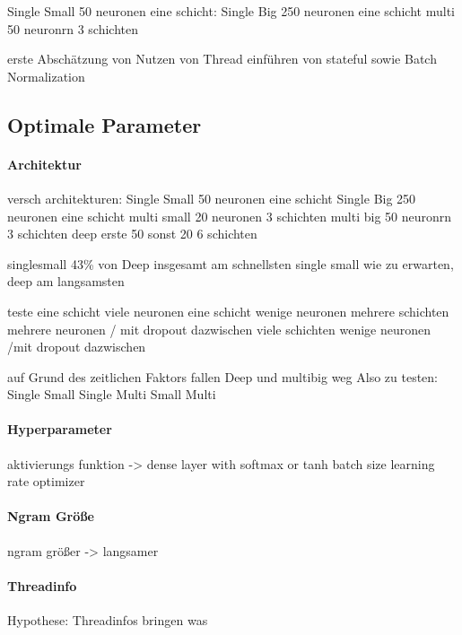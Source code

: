             Single Small 50 neuronen eine schicht:
            Single Big 250 neuronen eine schicht
            multi 50 neuronrn 3 schichten

        erste Abschätzung von Nutzen von Thread 
        einführen von stateful sowie Batch Normalization

    \subsection{Optimale Parameter}

        \paragraph{Architektur}
            versch architekturen:
            Single Small 50 neuronen eine schicht
            Single Big 250 neuronen eine schicht
            multi small 20 neuronen 3 schichten
            multi big 50 neuronrn 3 schichten
            deep erste 50 sonst 20 6 schichten

            singlesmall 43\% von Deep
            insgesamt am schnellsten single small
            wie zu erwarten,  deep am langsamsten

            teste eine schicht viele neuronen 
            eine schicht wenige neuronen
            mehrere schichten mehrere neuronen / mit dropout dazwischen
            viele schichten wenige neuronen /mit dropout dazwischen

            auf Grund des zeitlichen Faktors fallen Deep und multibig weg
            Also zu testen:
            Single Small
            Single 
            Multi Small
            Multi 

        \paragraph{Hyperparameter}
            aktivierungs funktion
            -> dense layer with softmax or tanh
            batch size
            learning rate
            optimizer

        \paragraph{Ngram Größe}
            ngram größer -> langsamer

        \paragraph{Threadinfo}
            Hypothese:
            Threadinfos bringen was

